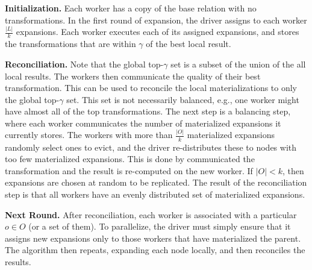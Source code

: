 \vspace{0.25em} \noindent  \textbf{Initialization. } 
Each worker has a copy of the base relation with no transformations.
In the first round of expansion, the driver assigns to each worker $\frac{|L|}{k}$ expansions. 
Each worker executes each of its assigned expansions, and stores the transformations that are within $\gamma$ of the best local result.

\vspace{0.25em} \noindent  \textbf{Reconciliation. }  Note that the global top-$\gamma$ set is a subset of the union of the all local results.
The workers then communicate the quality of their best transformation. This can be used to reconcile the local materializations to only the global top-$\gamma$ set.
This set is not necessarily balanced, e.g., one worker might have almost all of the top transformations.
The next step is a balancing step, where each worker communicates the number of materialized expansions it currently stores.
The workers with more than $\frac{|O|}{k}$ materialized expansions  randomly select ones to evict, and the driver re-distributes these to nodes with too few materialized expansions.
This is done by communicated the transformation and the result is re-computed on the new worker.
If $|O| < k$, then expansions are chosen at random to be replicated.
The result of the reconciliation step is that all workers have an evenly distributed set of materialized expansions.

\vspace{0.25em} \noindent  \textbf{Next Round. } After reconciliation, each worker is associated with a particular $o \in O$ (or a set of them). To parallelize, the driver must simply ensure that it assigns new expansions only to those workers that have materialized the parent.
The algorithm then repeats, expanding each node locally, and then reconciles the results.




